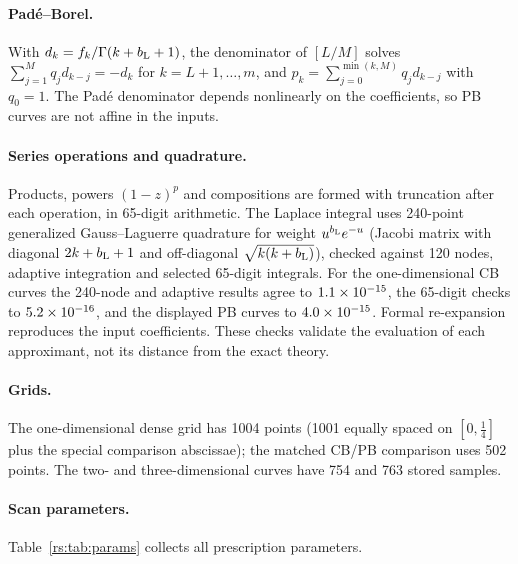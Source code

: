 \paragraph{Pad\'e--Borel.} With $d_k=f_k/\Gamma(k+b_{\mathrm L}+1)$, the denominator of $[L/M]$ solves
$\sum_{j=1}^Mq_jd_{k-j}=-d_k$ for $k=L+1,\dots,m$, and $p_k=\sum_{j=0}^{\min(k,M)}q_jd_{k-j}$
with $q_0=1$. The Pad\'e denominator depends nonlinearly on the coefficients, so PB curves are
not affine in the inputs.

\paragraph{Series operations and quadrature.} Products, powers $(1-z)^p$ and compositions are
formed with truncation after each operation, in 65-digit arithmetic. The Laplace integral uses
240-point generalized Gauss--Laguerre quadrature for weight $u^{b_{\mathrm L}}e^{-u}$ (Jacobi matrix with
diagonal $2k+b_{\mathrm L}+1$ and off-diagonal $\sqrt{k(k+b_{\mathrm L})}$), checked against 120 nodes, adaptive
integration and selected 65-digit integrals. For the one-dimensional CB curves the 240-node and
adaptive results agree to $1.1\times10^{-15}$, the 65-digit checks to $5.2\times10^{-16}$, and the
displayed PB curves to $4.0\times10^{-15}$. Formal re-expansion reproduces the input coefficients.
These checks validate the evaluation of each approximant, not its distance from the exact theory.

\paragraph{Grids.} The one-dimensional dense grid has 1004 points (1001 equally spaced on
$[0,\frac14]$ plus the special comparison abscissae); the matched CB/PB comparison uses 502
points. The two- and three-dimensional curves have 754 and 763 stored samples.

\paragraph{Scan parameters.} Table~\ref{rs:tab:params} collects all prescription parameters.

